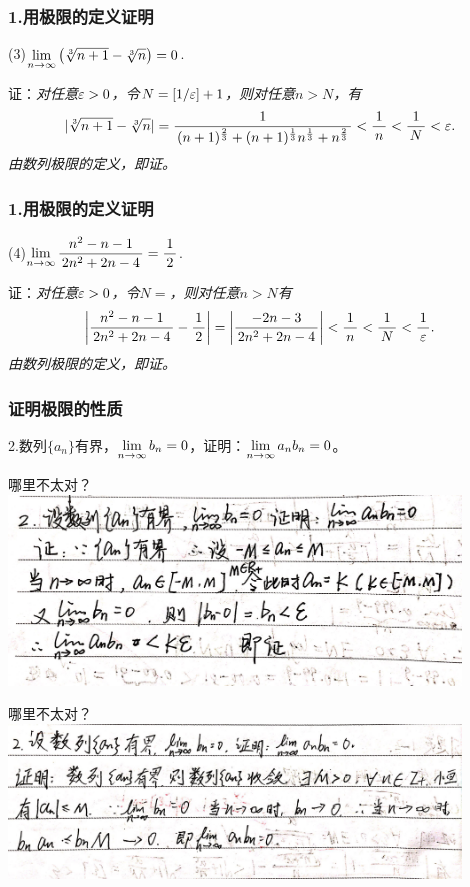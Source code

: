 \begin{frame}[t]\frametitle{1.用极限的定义证明}
\large

(3)$\lim\limits_{n\to\infty}\left(\sqrt[3]{n+1}-\sqrt[3]{n}\right)=0$.
\bs

证：\it 对任意$\varepsilon>0$，令$N=\left[1/\varepsilon\right]+1$，则对任意$n>N$，有
$$|\sqrt[3]{n+1}-\sqrt[3]{n}|
=\displaystyle\frac{\,{1}\,}{\,{(n+1)^{\frac{2}{3}}+(n+1)^{\frac13}n^{\frac13}+n^{\frac23}}\,}
<\displaystyle\frac{\,{1}\,}{\,{n}\,}<\displaystyle\frac{\,{1}\,}{\,{N}\,}<\varepsilon.$$
由数列极限的定义，即证。\fin
\end{frame}

\begin{frame}[t]\frametitle{1.用极限的定义证明}
\large

(4)$\lim\limits_{n\to\infty}\displaystyle\frac{\,{n^2-n-1}\,}{\,{2n^2+2n-4}\,}=\displaystyle\frac{\,{1}\,}{\,{2}\,}$.
\bs

证：\it 对任意$\varepsilon>0$，令$N=$，则对任意$n>N$有
$$\left|\displaystyle\frac{\,{n^2-n-1}\,}{\,{2n^2+2n-4}\,}-\displaystyle\frac{\,{1}\,}{\,{2}\,}\right|
=\left|\displaystyle\frac{\,{-2n-3}\,}{\,{2n^2+2n-4}\,}\right|<\displaystyle\frac{\,{1}\,}{\,{n}\,}<\displaystyle\frac{\,{1}\,}{\,{N}\,}<\displaystyle\frac{\,{1}\,}{\,{\varepsilon}\,}.$$
由数列极限的定义，即证。\fin
\end{frame}

\begin{frame}[t]\frametitle{证明极限的性质}
\large
2.数列$\{a_n\}$有界，$\lim\limits_{n\to\infty} b_n=0$，证明：$\lim\limits_{n\to\infty} a_nb_n=0$。
\end{frame}

\begin{frame}{哪里不太对？}
	\centering
	\includegraphics[width=0.9\textwidth]{./images/ch01/HWR/anbn0-1.jpeg}
\end{frame}

\begin{frame}{哪里不太对？}
	\centering
	\includegraphics[width=0.9\textwidth]{./images/ch01/HWR/anbn0-2.jpeg}
\end{frame}

